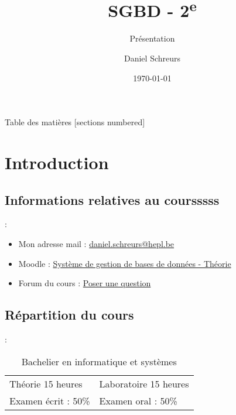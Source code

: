 \documentclass[10pt]{beamer}
\title{SGBD - 2\textsuperscript{e}}
\subtitle{Présentation}
\date{\today}
\author{Daniel Schreurs}
\institute{Haute École de la Province de Liège}
\begin{document}
\maketitle

\begin{frame}[allowframebreaks]{Table des matières}
    [sections numbered]
    \tableofcontents
\end{frame}

\section{Introduction}

\subsection{Informations relatives au coursssss}
\begin{frame}{\secname : \subsecname}
    \begin{itemize}
        \item Mon adresse mail : \href{mailto:daniel.schreurs@hepl.be}{daniel.schreurs@hepl.be}
        \item Moodle : \href{https://moodle.ecolevirtuelle.be/course/view.php?id=25655}{Système de gestion de bases de données - Théorie}
        \item Forum du cours : \href{https://moodle.ecolevirtuelle.be/mod/forum/view.php?id=183803}{Poser une question}
    \end{itemize}
\end{frame}

\subsection{Répartition du cours}
\begin{frame}{\secname : \subsecname}
    \begin{table}[]
        \begin{tabular}{ll}
            Théorie 15 heures   & Laboratoire 15 heures \\
            Examen écrit : 50\% & Examen oral : 50\%
        \end{tabular}
        \caption*{Bachelier en informatique et systèmes}
    \end{table}
\end{frame}
\end{document}
